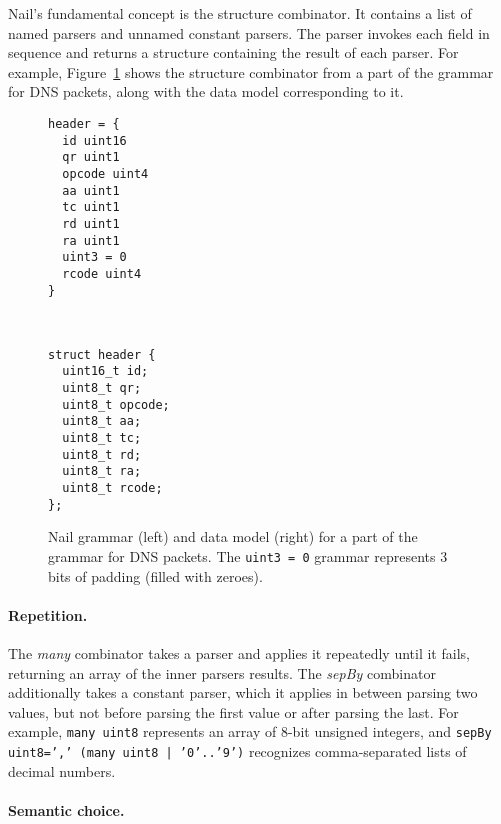 Nail's fundamental concept is the structure combinator. It contains a list of
named parsers and unnamed constant parsers. The parser invokes each field 
in sequence and returns a structure containing the result of each parser.
For example, Figure~\ref{fig:dns-struct} shows the structure combinator
from a part of the grammar for DNS packets, along with the data model
corresponding to it.

\begin{figure}[tb]

\begin{minipage}{0.45\columnwidth}
\begin{verbatim}
header = {
  id uint16
  qr uint1
  opcode uint4
  aa uint1 
  tc uint1
  rd uint1
  ra uint1
  uint3 = 0
  rcode uint4
}
\end{verbatim} 
\end{minipage}
~
\begin{minipage}{0.45\columnwidth}
\begin{verbatim}
struct header {
  uint16_t id;
  uint8_t qr;
  uint8_t opcode;
  uint8_t aa;
  uint8_t tc;
  uint8_t rd;
  uint8_t ra;
  uint8_t rcode;
};
\end{verbatim} 
\end{minipage}

\caption{Nail grammar (left) and data model (right) for a part of the
grammar for DNS packets.  The \texttt{uint3 = 0} grammar represents
3 bits of padding (filled with zeroes).}
\label{fig:dns-struct}
\end{figure}


\paragraph{Repetition.}

The \emph{many} combinator takes a parser and applies it repeatedly
until it fails, returning an array of the inner parsers results. The
\emph{sepBy} combinator
additionally takes a constant parser, which it applies in between parsing
two values, but not before parsing the first value or after parsing the
last.
For example, \texttt{many uint8} represents an array of 8-bit unsigned
integers, and \texttt{sepBy uint8=',' (many uint8 | '0'..'9')} recognizes
comma-separated lists of decimal numbers.


\paragraph{Semantic choice.}

